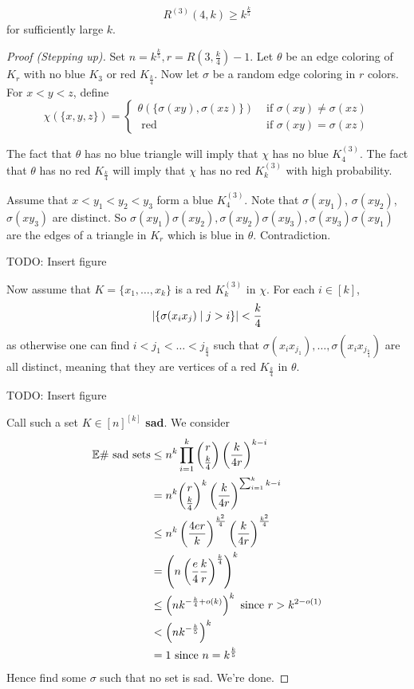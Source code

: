 \documentclass{article}
\begin{document}
\begin{thm}
  $$R^{(3)}(4, k) \ge k^{\frac k5}$$
  for sufficiently large $k$.
\end{thm}
\begin{proof}[Proof (Stepping up)]
  Set $n = k^{\frac k5}, r = R(3, \frac k4) - 1$. Let $\theta$ be an edge coloring of $K_r$ with no blue $K_3$ or red $K_{\frac k4}$. Now let $\sigma$ be a random edge coloring in $r$ colors. For $x < y < z$, define
  $$\chi(\{x, y, z\}) =
  \begin{cases}
    \theta(\{\sigma(xy), \sigma(xz)\}) & \text{ if } \sigma(xy) \ne \sigma(xz) \\
    \text{ red} & \text{ if } \sigma(xy) = \sigma(xz)
  \end{cases}$$
  \begin{idea}
    The fact that $\theta$ has no blue triangle will imply that $\chi$ has no blue $K_4^{(3)}$. The fact that $\theta$ has no red $K_{\frac k4}$ will imply that $\chi$ has no red $K_k^{(3)}$ with high probability.
  \end{idea}
  Assume that $x < y_1 < y_2 < y_3$ form a blue $K_4^{(3)}$. Note that $\sigma(xy_1)$, $\sigma(xy_2)$, $\sigma(xy_3)$ are distinct. So $\sigma(xy_1)\sigma(xy_2), \sigma(xy_2)\sigma(xy_3), \sigma(xy_3)\sigma(xy_1)$ are the edges of a triangle in $K_r$ which is blue in $\theta$. Contradiction.
  
  TODO: Insert figure

  Now assume that $K = \{x_1, \dots, x_k\}$ is a red $K_k^{(3)}$ in $\chi$. For each $i \in [k]$,
  $$\left\lvert \{\sigma(x_ix_j) \mid j > i\}\right\rvert < \frac k4$$
  as otherwise one can find $i < j_1 < \dots < j_{\frac k4}$ such that $\sigma(x_ix_{j_1}), \dots, \sigma(x_ix_{j_{\frac k4}})$ are all distinct, meaning that they are vertices of a red $K_{\frac k4}$ in $\theta$.
  
  TODO: Insert figure

  Call such a set $K \in [n]^{[k]}$ {\bf sad}. We consider
  \begin{align*}
    \mathbb E \#\text{ sad sets}
    & \le n^k \prod_{i = 1}^k \binom r{\frac k4} \left(\frac k{4r}\right)^{k - i} \\
    & = n^k \binom r{\frac k4}^k \left(\frac k{4r}\right)^{\sum_{i = 1}^k k - i} \\
    & \le n^k \left(\frac{4er}k\right)^{\frac{k^2}4} \left(\frac k{4r}\right)^{\frac{k^2}4} \\
    & = \left(n\left(\frac e4 \frac kr\right)^{\frac k4}\right)^k \\
    & \le \left(nk^{-\frac k4 + o(k)}\right)^k \text{ since } r > k^{2 - o(1)} \\
    & < \left(nk^{-\frac k5}\right)^k \\
    & = 1 \text{ since } n = k^{\frac k5}
  \end{align*}
  Hence find some $\sigma$ such that no set is sad. We're done.
\end{proof}
\end{document}
